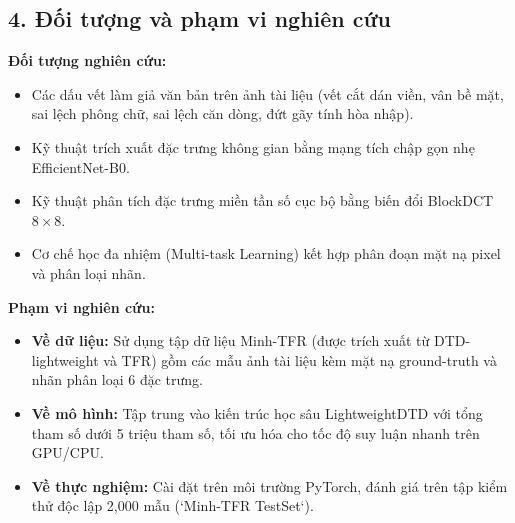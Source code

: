 \subsection{4. Đối tượng và phạm vi nghiên cứu}

\indent\indent \textbf{Đối tượng nghiên cứu:}
\begin{itemize}
    \item Các dấu vết làm giả văn bản trên ảnh tài liệu (vết cắt dán viền, vân bề mặt, sai lệch phông chữ, sai lệch căn dòng, đứt gãy tính hòa nhập).
    \item Kỹ thuật trích xuất đặc trưng không gian bằng mạng tích chập gọn nhẹ EfficientNet-B0.
    \item Kỹ thuật phân tích đặc trưng miền tần số cục bộ bằng biến đổi BlockDCT $8 \times 8$.
    \item Cơ chế học đa nhiệm (Multi-task Learning) kết hợp phân đoạn mặt nạ pixel và phân loại nhãn.
\end{itemize}
\vspace{0.3cm}

\textbf{Phạm vi nghiên cứu:}
\begin{itemize}
    \item \textbf{Về dữ liệu:} Sử dụng tập dữ liệu Minh-TFR (được trích xuất từ DTD-lightweight và TFR) gồm các mẫu ảnh tài liệu kèm mặt nạ ground-truth và nhãn phân loại 6 đặc trưng.
    \item \textbf{Về mô hình:} Tập trung vào kiến trúc học sâu LightweightDTD với tổng tham số dưới 5 triệu tham số, tối ưu hóa cho tốc độ suy luận nhanh trên GPU/CPU.
    \item \textbf{Về thực nghiệm:} Cài đặt trên môi trường PyTorch, đánh giá trên tập kiểm thử độc lập 2,000 mẫu (`Minh-TFR TestSet`).
\end{itemize}
